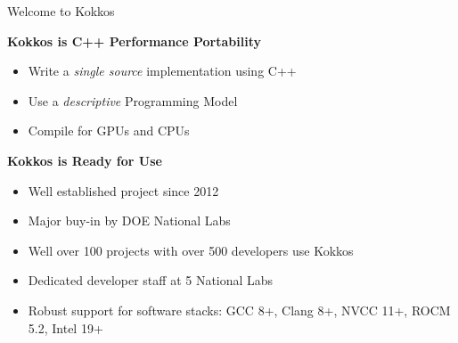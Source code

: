 




\begin{frame}{Welcome to Kokkos}

\textbf{Kokkos is C++ Performance Portability}
\begin{scriptsize}
  \begin{itemize} 
	  \item {Write a \textit{single source} implementation using C++}
	  \item {Use a \textit{descriptive} Programming Model}
	  \item {Compile for GPUs and CPUs}
  \end{itemize}
\end{scriptsize}

	\vspace{10pt}

\textbf{Kokkos is Ready for Use}
\begin{scriptsize}
  \begin{itemize} 
	  \item {Well established project since 2012}
	  \item {Major buy-in by DOE National Labs}
	  \item {Well over 100 projects with over 500 developers use Kokkos}
	  \item {Dedicated developer staff at 5 National Labs}
	  \item {Robust support for software stacks: GCC 8+, Clang 8+, NVCC 11+, ROCM 5.2, Intel 19+}
  \end{itemize}
\end{scriptsize}

\end{frame}


